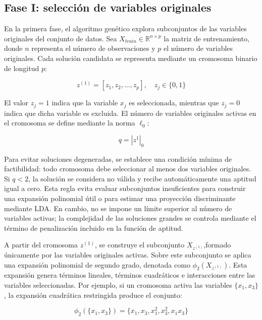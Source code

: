 \subsection{Fase I: selección de variables originales}


En la primera fase, el algoritmo genético explora subconjuntos de las variables originales del conjunto de datos. Sea $X_{train} \in \mathbb{R}^{n\times p}$ la matriz de entrenamiento, donde $n$ representa el número de observaciones y $p$ el número de variables originales. Cada solución candidata se representa mediante un cromosoma binario de longitud $p$:

\begin{equation}
	z^{(1)} = [z_1,z_2,\dots,z_p],  \quad z_j \in \{0,1\}
	\label{eq:EM1}
\end{equation}


El valor $z_j=1$ indica que la variable $x_j$ es seleccionada, mientras que $z_j=0$ indica que dicha variable es excluida. El número de variables originales activas en el cromosoma se define mediante la norma $\ell_0$:

\begin{equation}
	q = |z^{1}|_0
	\label{eq:EM2}
\end{equation}

Para evitar soluciones degeneradas, se establece una condición mínima de factibilidad: todo cromosoma debe seleccionar al menos dos variables originales. Si $q<2$, la solución se considera no válida y recibe automáticamente una aptitud igual a cero. Esta regla evita evaluar subconjuntos insuficientes para construir una expansión polinomial útil o para estimar una proyección discriminante mediante LDA. En cambio, no se impone un límite superior al número de variables activas; la complejidad de las soluciones grandes se controla mediante el término de penalización incluido en la función de aptitud.

A partir del cromosoma $z^{(1)}$, se construye el subconjunto $X_{z^{(1)}}$,formado únicamente por las variables originales activas. Sobre este subconjunto se aplica una expansión polinomial de segundo grado, denotada como $\phi_2(X_{z^{(1)}})$. Esta expansión genera términos lineales, términos cuadráticos e interacciones entre las variables seleccionadas. Por ejemplo, si un cromosoma activa las variables $\{x_1,x_3\}$, la expansión cuadrática restringida produce el conjunto:

\begin{equation}
	\phi_2(\{x_1,x_3\}) = \{x_1,x_3,x_1^2,x_3^2,x_1x_3\}
	\label{eq:EM3}
\end{equation}

